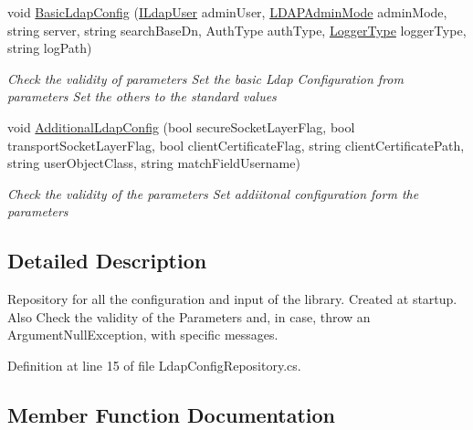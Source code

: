 \begin{DoxyCompactItemize}
\item 
void \hyperlink{class_l_d_a_p_library_1_1_ldap_config_repository_aac8007314f366acc1f50442e28e5e694}{Basic\+Ldap\+Config} (\hyperlink{interface_l_d_a_p_library_1_1_interfarces_1_1_i_ldap_user}{I\+Ldap\+User} admin\+User, \hyperlink{namespace_l_d_a_p_library_1_1_enums_aaaf5c3ff906b84752d719f58d502f15e}{L\+D\+A\+P\+Admin\+Mode} admin\+Mode, string server, string search\+Base\+Dn, Auth\+Type auth\+Type, \hyperlink{namespace_l_d_a_p_library_1_1_logger_a398123fc2bb2443d0e0821044d077795}{Logger\+Type} logger\+Type, string log\+Path)
\begin{DoxyCompactList}\small\item\em Check the validity of parameters Set the basic Ldap Configuration from parameters Set the others to the standard values \end{DoxyCompactList}\item 
void \hyperlink{class_l_d_a_p_library_1_1_ldap_config_repository_a2dd4a1750c9ec339cd445022caab5bfb}{Additional\+Ldap\+Config} (bool secure\+Socket\+Layer\+Flag, bool transport\+Socket\+Layer\+Flag, bool client\+Certificate\+Flag, string client\+Certificate\+Path, string user\+Object\+Class, string match\+Field\+Username)
\begin{DoxyCompactList}\small\item\em Check the validity of the parameters Set addiitonal configuration form the parameters \end{DoxyCompactList}\end{DoxyCompactItemize}


\subsection{Detailed Description}
Repository for all the configuration and input of the library. Created at startup. Also Check the validity of the Parameters and, in case, throw an Argument\+Null\+Exception, with specific messages. 



Definition at line 15 of file Ldap\+Config\+Repository.\+cs.



\subsection{Member Function Documentation}
\hypertarget{class_l_d_a_p_library_1_1_ldap_config_repository_a2dd4a1750c9ec339cd445022caab5bfb}{}

